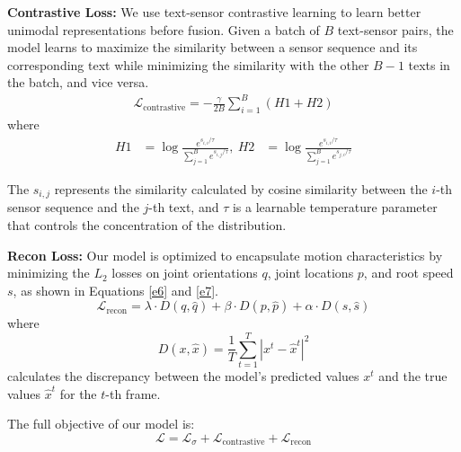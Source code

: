 \documentclass[letterpaper]{article} %
\begin{document}
\textbf{Contrastive Loss:} We use text-sensor contrastive learning to learn better unimodal representations before fusion. Given a batch of $B$ text-sensor pairs, the model learns to maximize the similarity between a sensor sequence and its corresponding text while minimizing the similarity with the other $B-1$ texts in the batch, and vice versa. 
\begin{align}
\mathcal{L}_{\text{contrastive}} = -\frac{\gamma}{2B} \sum_{i=1}^{B} \left(H1 + H2 \right)
\label{e4}
\end{align}
where
\begin{align}
H1 & = \log \frac{e^{s_{i, i} / \tau}}{\sum_{j=1}^{B}e^{s_{i, j} / \tau}}, \
H2 & = \log \frac{e^{s_{i, i} / \tau}}{\sum_{j=1}^{B}e^{s_{j, i} / \tau}}
\label{e5}
\end{align}

The $s_{i, j}$ represents the similarity calculated by cosine similarity between the $i$-th sensor sequence and the $j$-th text, and $\tau$ is a learnable temperature parameter that controls the concentration of the distribution.

\textbf{Recon Loss:} Our model is optimized to encapsulate motion characteristics by minimizing the $L_2$ losses on joint orientations $q$, joint locations $p$, and root speed $s$, as shown in Equations \eqref{e6} and \eqref{e7}.
\begin{equation}
\mathcal{L}_{\text{recon}} = \lambda \cdot {D}(q, \hat{q})+ \beta \cdot {D}(p, \hat{p}) + \alpha \cdot {D}(s, \hat{s}) 
\label{e6}
\end{equation}
where
\begin{equation}
{D}(x, \hat{x}) = \frac{1}{T}\sum_{t=1}^T\left|x^t-\hat{x}^t\right|^2
\label{e7}
\end{equation}
calculates the discrepancy between the model's predicted values $x^t$ and the true values $\hat{x}^t$ for the $t$-th frame.
 
The full objective of our model is:
 \begin{equation}
 \mathcal{L}=\mathcal{L}_\sigma+\mathcal{L}_{\text {contrastive}}+\mathcal{L}_{\text {recon}}
\end{equation}
\end{document}
